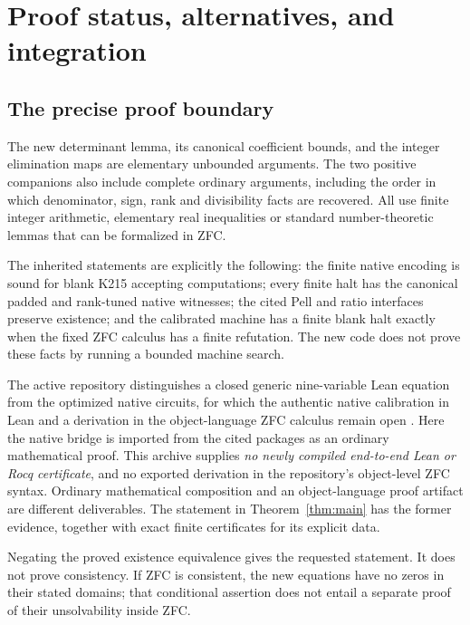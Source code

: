 \documentclass[11pt]{article}
\theoremstyle{definition}\newtheorem{definition}[theorem]{Definition}
\theoremstyle{remark}\newtheorem{remark}[theorem]{Remark}
\begin{document}



\section{Proof status, alternatives, and integration}
\label{sec:scope}

\subsection{The precise proof boundary}

The new determinant lemma, its canonical coefficient bounds, and the
integer elimination maps are elementary unbounded arguments. The two
positive companions also include complete ordinary arguments, including
the order in which denominator, sign, rank and divisibility facts are
recovered. All use finite integer arithmetic, elementary real inequalities
or standard number-theoretic lemmas that can be formalized in ZFC.

The inherited statements are explicitly the following: the finite native
encoding is sound for blank K215 accepting computations; every finite halt
has the canonical padded and rank-tuned native witnesses; the cited Pell
and ratio interfaces preserve existence; and the calibrated machine has a
finite blank halt exactly when the fixed ZFC calculus has a finite
refutation. The new code does not prove these facts by running a bounded
machine search.

The active repository distinguishes a closed generic nine-variable Lean
equation from the optimized native circuits, for which the authentic native
calibration in Lean and a derivation in the object-language ZFC calculus
remain open \cite{active}. Here the native bridge is imported from the cited
packages as an ordinary mathematical proof. This archive supplies
\emph{no newly compiled end-to-end Lean or Rocq
certificate}, and no exported derivation in the repository's object-level
ZFC syntax. Ordinary mathematical composition and an object-language
proof artifact are different deliverables. The statement in
Theorem~\ref{thm:main} has the former evidence, together with exact finite
certificates for its explicit data.

Negating the proved existence equivalence gives the requested statement.
It does not prove consistency. If ZFC is consistent, the new equations
have no zeros in their stated domains; that conditional assertion does
not entail a separate proof of their unsolvability inside ZFC.
\end{document}
